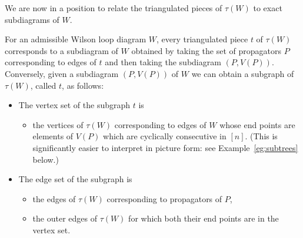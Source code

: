 \documentclass[11pt]{article}
\theoremstyle{remark}
\theoremstyle{definition}
\begin{document}
We are now in a position to relate the triangulated pieces of $\tau(W)$ to exact subdiagrams of $W$.

For an admissible Wilson loop diagram $W$, every triangulated piece $t$ of $\tau(W)$ corresponds to a subdiagram of $W$ obtained by taking the set of propagators $P$ corresponding to edges of $t$ and then taking the subdiagram $(P, V(P))$.  Conversely, given a subdiagram $(P, V(P))$ of $W$ we can obtain a subgraph of $\tau(W)$, called $t$, as follows:
\begin{itemize}
\item The vertex set of the subgraph $t$ is
  \begin{itemize}
  \item the vertices of $\tau(W)$ corresponding to edges of $W$ whose end points are elements of $V(P)$ which are cyclically consecutive in $[n]$. (This is significantly easier to interpret in picture form: see Example~\ref{eg:subtrees} below.)
  \end{itemize}
\item The edge set of the subgraph is
  \begin{itemize}
  \item the edges of $\tau(W)$ corresponding to propagators of $P$,
  \item the outer edges of $\tau(W)$ for which both their end points are in the vertex set.
  \end{itemize}
\end{itemize}
\end{document}
